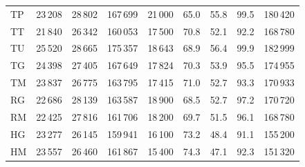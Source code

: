 \begin{minipage}{\textwidth}
\begin{tabular*}{\textwidth}{@{\extracolsep{\fill}}lrrrrrrrr@{}}
TP & 23\,208 & 28\,802 & 167\,699 & 21\,000 & 65.0 & 55.8 & 99.5 & 180\,420\\
TT & 21\,840 & 26\,342 & 160\,053 & 17\,500 & 70.8 & 52.1 & 92.2 & 168\,780\\
TU & 25\,520 & 28\,665 & 175\,357 & 18\,643 & 68.9 & 56.4 & 99.9 & 182\,999\\
TG & 24\,398 & 27\,405 & 167\,649 & 17\,824 & 70.3 & 53.9 & 95.5 & 174\,955\\
TM & 23\,837 & 26\,775 & 163\,795 & 17\,415 & 71.0 & 52.7 & 93.3 & 170\,933\\
RG & 22\,686 & 28\,139 & 163\,587 & 18\,900 & 68.5 & 52.7 & 97.2 & 170\,720\\
RM & 22\,425 & 27\,816 & 161\,706 & 18\,200 & 69.7 & 51.5 & 96.1 & 168\,780\\
HG & 23\,277 & 26\,145 & 159\,941 & 16\,100 & 73.2 & 48.4 & 91.1 & 155\,200\\
HM & 23\,557 & 26\,460 & 161\,867 & 15\,400 & 74.3 & 47.1 & 92.3 & 151\,320\\
\bottomrule\end{tabular*}
\end{minipage}\par\medskip
